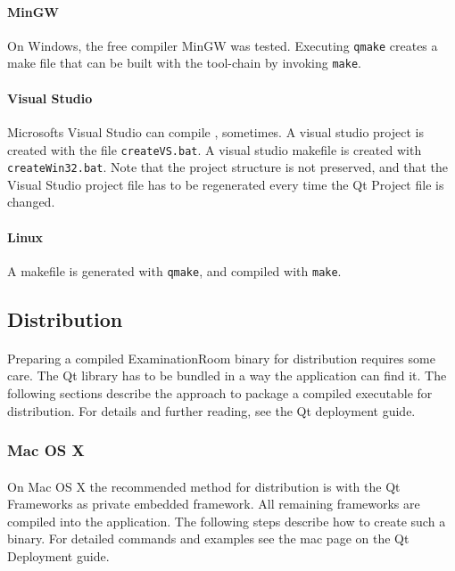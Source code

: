 \paragraph{MinGW}
On Windows, the free compiler MinGW was tested.
Executing \texttt{qmake} creates a make file that can be built with the tool-chain by invoking \texttt{make}.

\paragraph{Visual Studio}
Microsofts Visual Studio can compile \ER, sometimes.
A visual studio project is created with the file \texttt{createVS.bat}.
A visual studio makefile is created with \texttt{createWin32.bat}.
Note that the project structure is not preserved, and that the Visual Studio project file has to be regenerated every time the Qt Project file is changed.

\paragraph{Linux}
A makefile is generated with \texttt{qmake}, and compiled with \texttt{make}.


\subsection{Distribution}
\paragraph{}
Preparing a compiled ExaminationRoom binary for distribution requires some care.
The Qt library has to be bundled in a way the application can find it.
The following sections describe the approach to package a compiled executable for distribution.
For details and further reading, see the Qt deployment guide\cite{deployment}.

\subsubsection*{Mac OS X}
\paragraph{}
On Mac OS X the recommended method for distribution is with the Qt Frameworks as private embedded framework.
All remaining frameworks are compiled into the application.
The following steps describe how to create such a binary.
For detailed commands and examples see the mac page on the Qt Deployment guide\cite{deployment}.

